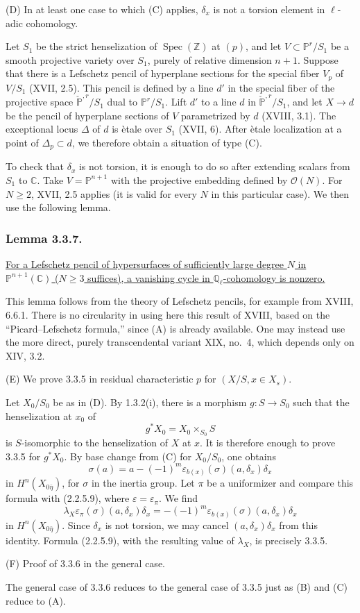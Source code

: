\par\medskip
\noindent\textup{(D)}
In at least one case to which (C) applies, $\delta_x$ is not a torsion
element in $\ell$-adic cohomology.

Let $S_1$ be the strict henselization of
$\operatorname{Spec}(\mathbb Z)$ at $(p)$, and let
$V\subset\mathbb P^r/S_1$ be a smooth projective variety over $S_1$,
purely of relative dimension $n+1$.  Suppose that there is a
Lefschetz pencil of hyperplane sections for the special fiber $V_p$
of $V/S_1$ (XVII, 2.5).  This pencil is defined by a line $d'$ in the
special fiber of the projective space $\check{\mathbb P}^{,r}/S_1$
dual to $\mathbb P^r/S_1$.  Lift $d'$ to a line $d$ in
$\check{\mathbb P}^{,r}/S_1$, and let $X\to d$ be the pencil of
hyperplane sections of $V$ parametrized by $d$ (XVIII, 3.1).  The
exceptional locus $\Delta$ of $d$ is \`etale over $S_1$ (XVII, 6).
After \`etale localization at a point of $\Delta_p\subset d$, we
therefore obtain a situation of type (C).

To check that $\delta_x$ is not torsion, it is enough to do so after
extending scalars from $S_1$ to $\mathbb C$.  Take
$V=\mathbb P^{n+1}$ with the projective embedding defined by
$\mathcal O(N)$.  For $N\ge2$, XVII, 2.5 applies (it is valid for
every $N$ in this particular case).  We then use the following lemma.

\subsubsection*{Lemma 3.3.7.}
\underline{For a Lefschetz pencil of hypersurfaces of sufficiently
large degree $N$ in $\mathbb P^{n+1}(\mathbb C)$ ($N\ge3$ suffices),
a vanishing cycle in $\mathbb Q_\ell$-cohomology is nonzero.}

This lemma follows from the theory of Lefschetz pencils, for example
from XVIII, 6.6.1.  There is no circularity in using here this result
of XVIII, based on the ``Picard--Lefschetz formula,'' since (A) is
already available.  One may instead use the more direct, purely
transcendental variant XIX, no.~4, which depends only on XIV, 3.2.

\medskip
\noindent\textup{(E)}
We prove 3.3.5 in residual characteristic $p$ for
$(X/S,x\in X_s)$.

Let $X_0/S_0$ be as in (D).  By 1.3.2(i), there is a morphism
$g:S\to S_0$ such that the henselization at $x_0$ of
\[
g^*X_0=X_0\times_{S_0}S
\]
is $S$-isomorphic to the henselization of $X$ at $x$.  It is
therefore enough to prove 3.3.5 for $g^*X_0$.  By base change from
(C) for $X_0/S_0$, one obtains
\[
\sigma(a)=a-(-1)^m
\varepsilon_{b(x)}(\sigma)(a,\delta_x)\delta_x
\]
in $H^n(X_{0\bar\eta})$, for $\sigma$ in the inertia group.  Let
$\pi$ be a uniformizer and compare this formula with (2.2.5.9), where
$\varepsilon=\varepsilon_\pi$.  We find
\[
\lambda_X\varepsilon_\pi(\sigma)(a,\delta_x)\delta_x
=-(-1)^m\varepsilon_{b(x)}(\sigma)(a,\delta_x)\delta_x
\]
in $H^n(X_{0\bar\eta})$.  Since $\delta_x$ is not torsion, we may
cancel $(a,\delta_x)\delta_x$ from this identity.  Formula (2.2.5.9),
with the resulting value of $\lambda_X$, is precisely 3.3.5.

\medskip
\noindent\textup{(F) Proof of 3.3.6 in the general case.}

The general case of 3.3.6 reduces to the general case of 3.3.5 just
as (B) and (C) reduce to (A).
